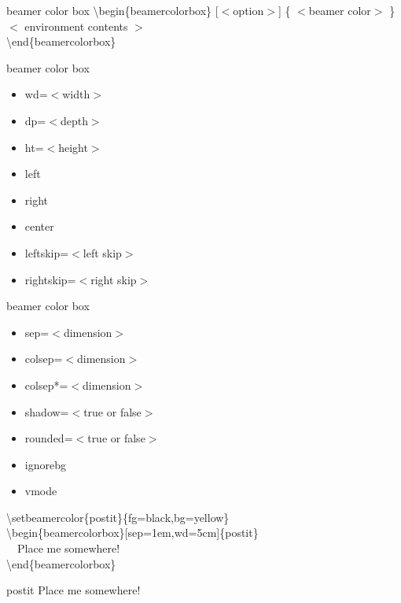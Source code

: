 \documentclass[9pt,blue,xcolor=pdftex,dvipsnames,table,handout,notes]{beamer}
\begin{document}
		\begin{frame}[t]


		\begin{block} {beamer color box}
			\textbackslash begin\{beamercolorbox\} [$<$option$>$] \{ $<$beamer color$>$ \}\\
			$<$ environment contents $>$ \\
			\textbackslash end\{beamercolorbox\}
		\end{block}

		\begin{block} {beamer color box}
			\begin{itemize}	
			\item	wd=$<$width$>$
			\item	dp=$<$depth$>$
			\item	ht=$<$height$>$
			\item	left
			\item	right
			\item	center
			\item	leftskip=$<$left skip$>$
			\item	rightskip=$<$right skip$>$
			\end{itemize}
		\end{block}

		\begin{block} {beamer color box}
			\begin{itemize}	
			\item	sep=$<$dimension$>$
			\item	colsep=$<$dimension$>$
			\item	colsep*=$<$dimension$>$
			\item	shadow=$<$true or false$>$
			\item	rounded=$<$true or false$>$
			\item	ignorebg
			\item	vmode
			\end{itemize}
		\end{block}

			\begin{example}
				\textbackslash setbeamercolor\{postit\}\{fg=black,bg=yellow\} \\
				\textbackslash begin\{beamercolorbox\}[sep=1em,wd=5cm]\{postit\} \\
				~~Place me somewhere! \\
				\textbackslash end\{beamercolorbox\}\\
			\end{example}


			\begin{beamercolorbox}[sep=1em,wd=5cm]{postit}
			Place me somewhere!
			\end{beamercolorbox}

		\end{frame}
\end{document}
